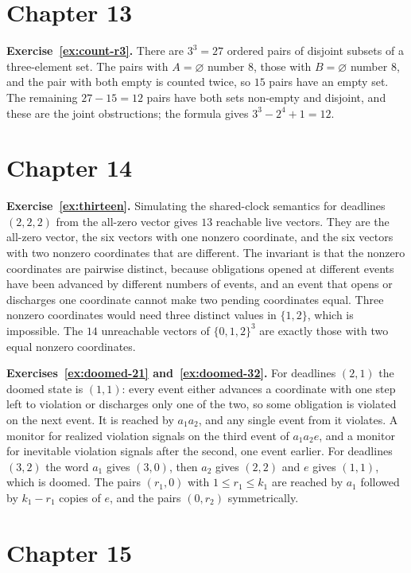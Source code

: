 \section*{Chapter 13}

\textbf{Exercise~\ref{ex:count-r3}.} There are $3^{3}=27$ ordered pairs of disjoint subsets of a three-element set. The pairs with $A=\varnothing$ number $8$, those with $B=\varnothing$ number $8$, and the pair with both empty is counted twice, so $15$ pairs have an empty set. The remaining $27-15=12$ pairs have both sets non-empty and disjoint, and these are the joint obstructions; the formula gives $3^{3}-2^{4}+1=12$.

\section*{Chapter 14}

\textbf{Exercise~\ref{ex:thirteen}.} Simulating the shared-clock semantics for deadlines $(2,2,2)$ from the all-zero vector gives $13$ reachable live vectors. They are the all-zero vector, the six vectors with one nonzero coordinate, and the six vectors with two nonzero coordinates that are different. The invariant is that the nonzero coordinates are pairwise distinct, because obligations opened at different events have been advanced by different numbers of events, and an event that opens or discharges one coordinate cannot make two pending coordinates equal. Three nonzero coordinates would need three distinct values in $\{1,2\}$, which is impossible. The $14$ unreachable vectors of $\{0,1,2\}^{3}$ are exactly those with two equal nonzero coordinates.

\textbf{Exercises~\ref{ex:doomed-21} and~\ref{ex:doomed-32}.} For deadlines $(2,1)$ the doomed state is $(1,1)$: every event either advances a coordinate with one step left to violation or discharges only one of the two, so some obligation is violated on the next event. It is reached by $a_1a_2$, and any single event from it violates. A monitor for realized violation signals on the third event of $a_1a_2e$, and a monitor for inevitable violation signals after the second, one event earlier. For deadlines $(3,2)$ the word $a_1$ gives $(3,0)$, then $a_2$ gives $(2,2)$ and $e$ gives $(1,1)$, which is doomed. The pairs $(r_1,0)$ with $1\le r_1\le k_1$ are reached by $a_1$ followed by $k_1-r_1$ copies of $e$, and the pairs $(0,r_2)$ symmetrically.

\section*{Chapter 15}

